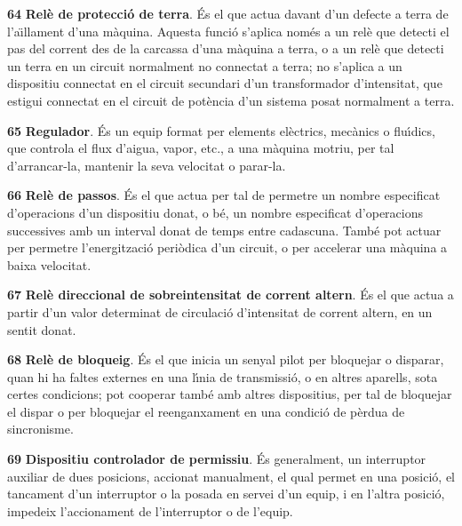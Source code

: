 \begin{multicols}{2}
\begin{list}{}
\item[\textbf{64}]  \textbf{Rel\`{e} de protecci\'{o} de terra}.
\'{E}s el que actua davant d'un defecte a terra de l'a\"{\i}llament d'una
m\`{a}quina. Aquesta funci\'{o} s'aplica nom\'{e}s a un rel\`{e} que detecti el pas
del corrent des de la carcassa  d'una m\`{a}quina a terra, o a un rel\`{e}
que detecti un terra en un circuit normalment no connectat a terra;
no s'aplica a un dispositiu connectat en el circuit secundari d'un
transformador d'intensitat, que estigui connectat en el circuit de
pot\`{e}ncia d'un sistema posat normalment a terra.

\item[\textbf{65}]  \textbf{Regulador}. \'{E}s un equip format per elements
el\`{e}ctrics, mec\`{a}nics o flu\'{\i}dics,  que controla el flux d'aigua,
vapor, etc.,  a una m\`{a}quina motriu, per tal d'arrancar-la, mantenir
la seva velocitat o parar-la.

\item[\textbf{66}]  \textbf{Rel\`{e} de passos}. \'{E}s el que actua per tal
de permetre un nombre especificat d'operacions d'un dispositiu
donat, o b\'{e}, un nombre especificat d'operacions successives amb un
interval donat de temps entre cadascuna. Tamb\'{e} pot actuar per
permetre l'energitzaci\'{o} peri\`{o}dica d'un circuit, o per accelerar una
m\`{a}quina a baixa velocitat.

\item[\textbf{67}] 
\textbf{Rel\`{e} direccional de sobreintensitat de corrent altern}. \'{E}s
el que actua a partir d'un valor determinat de circulaci\'{o}
d'intensitat  de corrent altern, en un sentit donat.

\item[\textbf{68}]  \textbf{Rel\`{e} de bloqueig}. \'{E}s el que inicia un
senyal pilot per bloquejar o disparar, quan hi ha faltes externes en
una l\'{\i}nia de transmissi\'{o}, o en altres aparells, sota certes
condicions; pot cooperar tamb\'{e} amb altres dispositius, per tal de
bloquejar el dispar o per bloquejar el reenganxament en una condici\'{o}
de p\`{e}rdua de sincronisme.

\item[\textbf{69}]  \textbf{Dispositiu controlador de permissiu}. \'{E}s
generalment, un interruptor auxiliar de dues posicions, accionat
manualment, el qual permet en una posici\'{o}, el tancament d'un
interruptor o la posada en servei d'un equip, i en l'altra posici\'{o},
impedeix l'accionament de l'interruptor o de l'equip.


\end{list}
\end{multicols}
